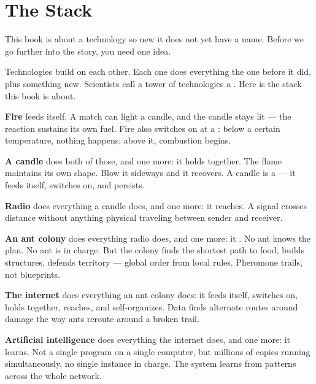 
\chapter*{The Stack}
\label{the-stack}
\label{spine:the-stack}
\hypertarget{the-stack}{}

This book is about a technology so new it does not yet have a name. Before we go further into the story, you need one idea.

Technologies build on each other. Each one does everything the one before it did, plus something new. Scientists call a tower of technologies a . Here is the stack this book is about.

\textbf{Fire} feeds itself. A match can light a candle, and the candle stays lit --- the reaction sustains its own fuel. Fire also switches on at a : below a certain temperature, nothing happens; above it, combustion begins.

\textbf{A candle} does both of those, and one more: it holds together. The flame maintains its own shape. Blow it sideways and it recovers. A candle is a  --- it feeds itself, switches on, and persists.

\textbf{Radio} does everything a candle does, and one more: it reaches. A signal crosses distance without anything physical traveling between sender and receiver.

\textbf{An ant colony} does everything radio does, and one more: it . No ant knows the plan. No ant is in charge. But the colony finds the shortest path to food, builds structures, defends territory --- global order from local rules. Pheromone trails, not blueprints.

\textbf{The internet} does everything an ant colony does: it feeds itself, switches on, holds together, reaches, and self-organizes. Data finds alternate routes around damage the way ants reroute around a broken trail.

\textbf{Artificial intelligence} does everything the internet does, and one more: it learns. Not a single program on a single computer, but millions of copies running simultaneously, no single instance in charge. The system learns from patterns across the whole network.

